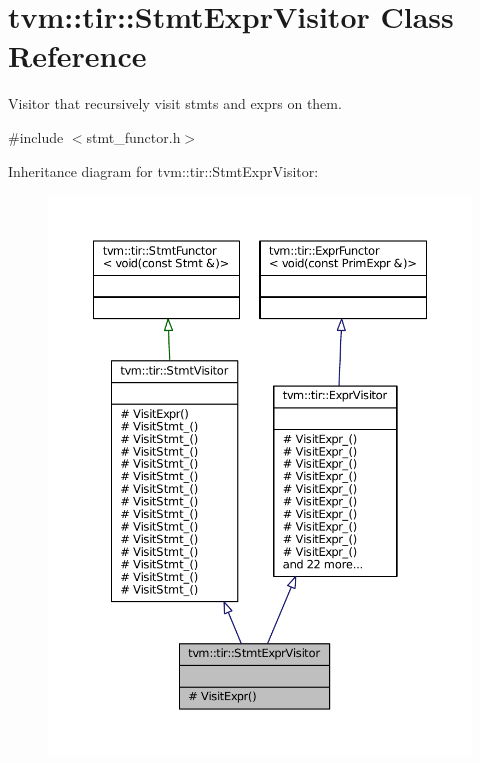 \hypertarget{classtvm_1_1tir_1_1StmtExprVisitor}{}\section{tvm\+:\+:tir\+:\+:Stmt\+Expr\+Visitor Class Reference}
\label{classtvm_1_1tir_1_1StmtExprVisitor}


Visitor that recursively visit stmts and exprs on them.  




{\ttfamily \#include $<$stmt\+\_\+functor.\+h$>$}



Inheritance diagram for tvm\+:\+:tir\+:\+:Stmt\+Expr\+Visitor\+:
\nopagebreak
\begin{figure}[H]
\begin{center}
\leavevmode
\includegraphics[width=350pt]{classtvm_1_1tir_1_1StmtExprVisitor__inherit__graph}
\end{center}
\end{figure}


